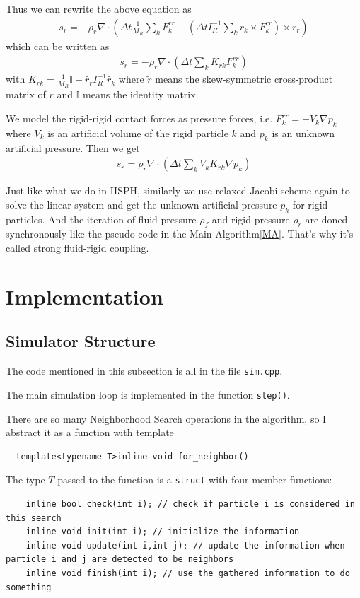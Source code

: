 \documentclass[acmlarge]{acmart}
\begin{document}
Thus we can rewrite the above equation as 
\begin{align*}
  s_r=-\rho_r\nabla \cdot (\Delta t\frac{1}{M_R}\sum_k F_k^{rr}-(\Delta t I_R^{-1}\sum_k r_k\times F_k^{rr})\times r_r)
\end{align*}
which can be written as 
\begin{align*}
  s_r=-\rho_r\nabla\cdot(\Delta t\sum_k K_{rk}F_k^{rr})
\end{align*}
with $K_{rk}=\frac{1}{M_R}\mathbb{I}-\tilde{r_r}I_R^{-1}\tilde{r_k} $ where $\tilde{r}$ means 
the skew-symmetric cross-product matrix of $r$ and $\mathbb{I}$ means the identity matrix.

We model the rigid-rigid contact forces as pressure forces, i.e. $F_k^{rr}=-V_k\nabla p_k$ where $V_k$ is an 
artificial volume of the rigid particle $k$ and $p_k$ is an unknown artificial pressure. Then we get
\begin{align*}
  s_r=\rho_r\nabla\cdot(\Delta t\sum_k V_k K_{rk}\nabla p_k)
\end{align*}

Just like what we do in IISPH, similarly we use relaxed Jacobi scheme again to solve the linear system and 
get the unknown artificial pressure $p_k$ for rigid particles. And the iteration of fluid pressure $\rho_f$ and rigid pressure $\rho_r$
are doned synchronously like the pseudo code in the Main Algorithm\ref{MA}. That's why it's called strong fluid-rigid coupling.



\section{Implementation}

\subsection{Simulator Structure}

The code mentioned in this subsection is all in the file \texttt{sim.cpp}.

The main simulation loop is implemented in the function \texttt{step()}.

There are so many Neighborhood Search operations in the algorithm, so I abstract it as a function with template
\begin{lstlisting}
  template<typename T>inline void for_neighbor()
\end{lstlisting}
The type $T$ passed to the function is a \texttt{struct} with four member functions:
\begin{lstlisting}
	inline bool check(int i); // check if particle i is considered in this search
	inline void init(int i); // initialize the information
	inline void update(int i,int j); // update the information when particle i and j are detected to be neighbors
	inline void finish(int i); // use the gathered information to do something
\end{lstlisting}
\end{document}
